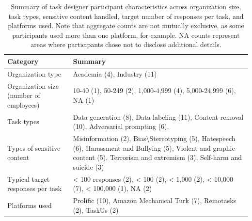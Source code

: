 \begin{table}
\centering
\small
\begin{tabular}{p{2cm} p{5cm}}
\toprule
\textbf{Category} & \textbf{Summary} \\
\midrule
Organization type 
& Academia (4), Industry (11)\\
Organization size (number of employees)
& 10-40 (1), 50-249 (2), 1,000-4,999 (4), 5,000-24,999 (6), NA (1)\\

Task types 
& Data generation (8), Data labeling (11), Content removal (10), Adversarial prompting (6),  \\

Types of sensitive content 
& Misinformation (2), Bias\textbackslash Stereotyping (5), Hatespeech (6), Harassment and Bullying (5), Violent and graphic content (5), Terrorism and extremism (3), Self-harm and suicide (3)\\

Typical target responses per task
& < 100 responses (2), < 100 (2), < 1,000 (2), < 10,000 (7), < 100,000 (1), NA (2)\\

Platforms used 
& Prolific (10), Amazon Mechanical Turk (7), Remotasks (2), TaskUs (2) \\
\bottomrule
\end{tabular}
\caption{Summary of task designer participant characteristics across organization size, task types, sensitive content handled, target number of responses per task, and platforms used. Note that aggregate counts are not mutually exclusive, as some participants used more than one platform, for example. NA counts represent areas where participants chose not to disclose additional details.}
\label{tab:participant_summary_task_designer}
\end{table}

